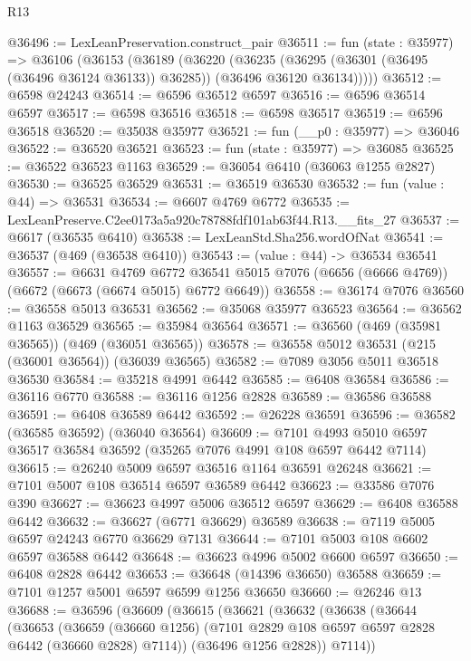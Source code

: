 \begin{lexlean}{R13}
\begin{coremodule}
@36496 := LexLeanPreservation.construct_pair
@36511 := fun (state : @35977) =>
  @36106
    (@36153
      (@36189
        (@36220
          (@36235
            (@36295 (@36301 (@36495 (@36496 @36124 @36133)) @36285))
            (@36496 @36120 @36134)))))
@36512 := @6598 @24243
@36514 := @6596 @36512 @6597
@36516 := @6596 @36514 @6597
@36517 := @6598 @36516
@36518 := @6598 @36517
@36519 := @6596 @36518
@36520 := @35038 @35977
@36521 := fun (__p0 : @35977) => @36046
@36522 := @36520 @36521
@36523 := fun (state : @35977) => @36085
@36525 := @36522 @36523 @1163
@36529 := @36054 @6410 (@36063 @1255 @2827)
@36530 := @36525 @36529
@36531 := @36519 @36530
@36532 := fun (value : @44) => @36531
@36534 := @6607 @4769 @6772
@36535 := LexLeanPreserve.C2ee0173a5a920c78788fdf101ab63f44.R13.__fits_27
@36537 := @6617 (@36535 @6410)
@36538 := LexLeanStd.Sha256.wordOfNat
@36541 := @36537 (@469 (@36538 @6410))
@36543 := (value : @44) -> @36534 @36541
@36557 := @6631
    @4769
    @6772
    @36541
    @5015
    @7076
    (@6656 (@6666 @4769))
    (@6672 (@6673 (@6674 @5015) @6772 @6649))
@36558 := @36174 @7076
@36560 := @36558 @5013 @36531
@36562 := @35068 @35977 @36523
@36564 := @36562 @1163 @36529
@36565 := @35984 @36564
@36571 := @36560 (@469 (@35981 @36565)) (@469 (@36051 @36565))
@36578 := @36558 @5012 @36531 (@215 (@36001 @36564)) (@36039 @36565)
@36582 := @7089 @3056 @5011 @36518 @36530
@36584 := @35218 @4991 @6442
@36585 := @6408 @36584
@36586 := @36116 @6770
@36588 := @36116 @1256 @2828
@36589 := @36586 @36588
@36591 := @6408 @36589 @6442
@36592 := @26228 @36591
@36596 := @36582 (@36585 @36592) (@36040 @36564)
@36609 := @7101 @4993 @5010 @6597 @36517 @36584 @36592 (@35265 @7076 @4991 @108 @6597 @6442 @7114)
@36615 := @26240 @5009 @6597 @36516 @1164 @36591 @26248
@36621 := @7101 @5007 @108 @36514 @6597 @36589 @6442
@36623 := @33586 @7076 @390
@36627 := @36623 @4997 @5006 @36512 @6597
@36629 := @6408 @36588 @6442
@36632 := @36627 (@6771 @36629) @36589
@36638 := @7119 @5005 @6597 @24243 @6770 @36629 @7131
@36644 := @7101 @5003 @108 @6602 @6597 @36588 @6442
@36648 := @36623 @4996 @5002 @6600 @6597
@36650 := @6408 @2828 @6442
@36653 := @36648 (@14396 @36650) @36588
@36659 := @7101 @1257 @5001 @6597 @6599 @1256 @36650
@36660 := @26246 @13
@36688 := @36596
    (@36609
      (@36615
        (@36621
          (@36632
            (@36638
              (@36644
                (@36653
                  (@36659
                    (@36660 @1256)
                    (@7101 @2829 @108 @6597 @6597 @2828 @6442 (@36660 @2828) @7114))
                  (@36496 @1256 @2828))
                @7114))

\end{coremodule}
\end{lexlean}
